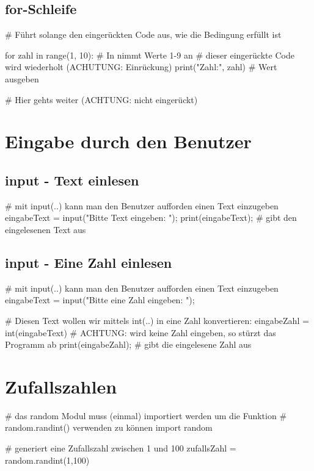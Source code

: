 \documentclass{\VorlagenPfad/coderdojokatext}
\begin{document}
\subsection{for-Schleife}
\begin{pythoncode}
# Führt solange den eingerückten Code aus, wie die Bedingung erfüllt ist

for zahl in range(1, 10): # In nimmt Werte 1-9 an
	# dieser eingerückte Code wird wiederholt (ACHUTUNG: Einrückung)
	print("Zahl:", zahl) # Wert ausgeben

# Hier gehts weiter (ACHTUNG: nicht eingerückt)
\end{pythoncode}

\section{Eingabe durch den Benutzer}
\subsection{input - Text einlesen}
\begin{pythoncode}
# mit input(..) kann man den Benutzer aufforden einen Text einzugeben
eingabeText = input("Bitte Text eingeben: "); 
print(eingabeText); # gibt den eingelesenen Text aus
\end{pythoncode}

\subsection{input - Eine Zahl einlesen}
\begin{pythoncode}
# mit input(..) kann man den Benutzer aufforden einen Text einzugeben
eingabeText = input("Bitte eine Zahl eingeben: "); 

# Diesen Text wollen wir mittels int(..) in eine Zahl konvertieren:
eingabeZahl = int(eingabeText) 
# ACHTUNG: wird keine Zahl eingeben, so stürzt das Programm ab
print(eingabeZahl); # gibt die eingelesene Zahl aus
\end{pythoncode}


\section{Zufallszahlen}

\begin{pythoncode}
# das random Modul muss (einmal) importiert werden um die Funktion
# random.randint() verwenden zu können
import random 

# generiert eine Zufallszahl zwischen 1 und 100
zufallsZahl = random.randint(1,100)
\end{pythoncode}
\end{document}
